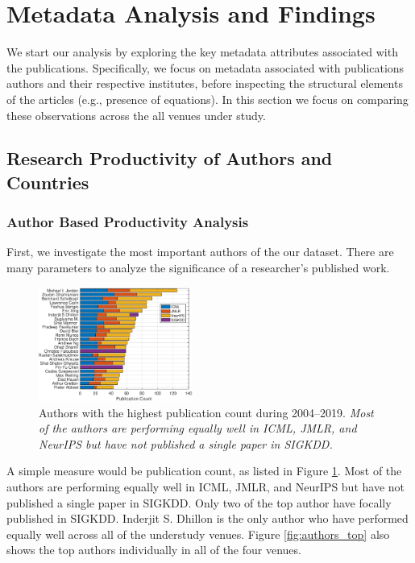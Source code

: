 \section{Metadata Analysis and Findings}
\label{sec:metadata}

We start our analysis by exploring the key metadata attributes associated with the publications. Specifically, we focus on metadata associated with publications authors and their respective institutes, before inspecting the structural elements of the articles (e.g., presence of equations). In this section we focus on comparing these observations across the all venues under study. 

\subsection{Research Productivity of Authors and Countries}

\vspace{2mm}
\subsubsection{Author Based Productivity Analysis}

First, we investigate the most important authors of the our dataset.  There are many parameters to analyze the significance of a researcher's published work. 


\begin{figure}[H]
	\begin{center}
		\includegraphics[width=0.45\textwidth]{figure/Total_pub_auth.eps}
	\end{center}
	\caption{Authors with the highest publication count during 2004--2019. \textit{Most of the authors are performing equally well in ICML, JMLR, and NeurIPS but have not published a single paper in SIGKDD.}}
	\label{fig:author_total}
\end{figure}

A simple measure would be publication count,  as listed in Figure \ref{fig:author_total}. Most of the authors are performing equally well in ICML, JMLR, and NeurIPS but have not published a single paper in SIGKDD. Only two of the top author have focally published in SIGKDD. Inderjit S. Dhillon is the only author who have performed equally well across all of the understudy venues. Figure \ref{fig:authors_top} also shows the top authors individually in all of the four venues.

